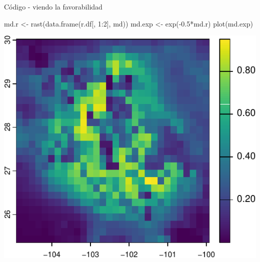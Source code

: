 \documentclass[
  11pt,
  ignorenonframetext,
]{beamer}
\newenvironment{Shaded}{}{}
\newcommand{\DecValTok}[1]{\textcolor[rgb]{0.25,0.63,0.44}{#1}}
\newcommand{\FloatTok}[1]{\textcolor[rgb]{0.25,0.63,0.44}{#1}}
\newcommand{\FunctionTok}[1]{\textcolor[rgb]{0.02,0.16,0.49}{#1}}
\newcommand{\NormalTok}[1]{#1}
\newcommand{\OtherTok}[1]{\textcolor[rgb]{0.00,0.44,0.13}{#1}}
\newcommand{\SpecialCharTok}[1]{\textcolor[rgb]{0.25,0.44,0.63}{#1}}
\begin{document}
\begin{frame}[fragile]{Código - viendo la favorabilidad}
\protect\hypertarget{cuxf3digo---viendo-la-favorabilidad}{}
\begin{Shaded}
\begin{Highlighting}[]
\NormalTok{md.r }\OtherTok{\textless{}{-}} \FunctionTok{rast}\NormalTok{(}\FunctionTok{data.frame}\NormalTok{(r.df[, }\DecValTok{1}\SpecialCharTok{:}\DecValTok{2}\NormalTok{], md))}
\NormalTok{md.exp }\OtherTok{\textless{}{-}} \FunctionTok{exp}\NormalTok{(}\SpecialCharTok{{-}}\FloatTok{0.5}\SpecialCharTok{*}\NormalTok{md.r)}
\FunctionTok{plot}\NormalTok{(md.exp)}
\end{Highlighting}
\end{Shaded}

\begin{center}\includegraphics{Tutorial-spatstat-2_files/figure-beamer/unnamed-chunk-4-1} \end{center}
\end{frame}
\end{document}

